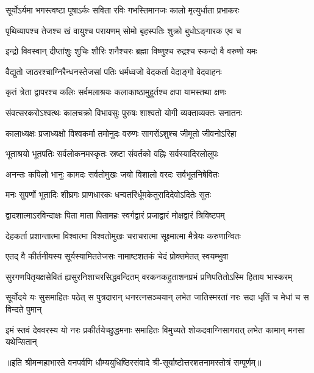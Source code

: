 


\twolineshloka
{सूर्योऽर्यमा भगस्त्वष्टा पूषाऽर्कः सविता रविः}
{गभस्तिमानजः कालो मृत्युर्धाता प्रभाकरः}

\twolineshloka
{पृथिव्यापश्च तेजश्च खं वायुश्च परायणम्}
{सोमो बृहस्पतिः शुक्रो बुधोऽङ्गारक एव च}

\twolineshloka
{इन्द्रो विवस्वान् दीप्तांशुः शुचिः शौरिः शनैश्चरः}
{ब्रह्मा विष्णुश्च रुद्रश्च स्कन्दो वै वरुणो यमः}

\twolineshloka
{वैद्युतो जाठरश्चाग्निरैन्धनस्तेजसां पतिः}
{धर्मध्वजो वेदकर्ता वेदाङ्गो वेदवाहनः}

\twolineshloka
{कृतं त्रेता द्वापरश्च कलिः सर्वमलाश्रयः}
{कलाकाष्ठामुहूर्तश्च क्षपा यामस्तथा क्षणः}

\twolineshloka
{संवत्सरकरोऽश्वत्थः कालचक्रो विभावसुः}
{पुरुषः शाश्वतो योगी व्यक्ताव्यक्तः सनातनः}

\twolineshloka
{कालाध्यक्षः प्रजाध्यक्षो विश्वकर्मा तमोनुदः}
{वरुणः सागरोंऽशुश्च जीमूतो जीवनोऽरिहा}

\twolineshloka
{भूताश्रयो भूतपतिः सर्वलोकनमस्कृतः}
{स्रष्टा संवर्तको वह्निः सर्वस्यादिरलोलुपः}

\twolineshloka
{अनन्तः कपिलो भानुः कामदः सर्वतोमुखः}
{जयो विशालो वरदः सर्वभूतनिषेवितः}

\twolineshloka
{मनः सुपर्णो भूतादिः शीघ्रगः प्राणधारकः}
{धन्वतरिर्धूमकेतुरादिदेवोऽदितेः सुतः}

\twolineshloka
{द्वादशात्माऽरविन्दाक्षः पिता माता पितामहः}
{स्वर्गद्वारं प्रजाद्वारं मोक्षद्वारं त्रिविष्टपम्}

\twolineshloka
{देहकर्ता प्रशान्तात्मा विश्वात्मा विश्वतोमुखः}
{चराचरात्मा सूक्ष्मात्मा मैत्रेयः करुणान्वितः}

\twolineshloka
{एतद् वै कीर्तनीयस्य सूर्यस्यामिततेजसः}
{नामाष्टशतकं चेदं प्रोक्तमेतत् स्वयम्भुवा}

\fourlineindentedshloka
{सुरगणपितृयक्षसेवितं}
{ह्यसुरनिशाचरसिद्धवन्दितम्}
{वरकनकहुताशनप्रभं}
{प्रणिपतितोऽस्मि हिताय भास्करम्}

\fourlineindentedshloka
{सूर्योदये यः सुसमाहितः पठेत्}
{स पुत्रदारान् धनरत्नसञ्चयान्}
{लभेत जातिस्मरतां नरः सदा}
{धृतिं च मेधां च स विन्दते पुमान्}

\fourlineindentedshloka
{इमं स्तवं देववरस्य यो नरः}
{प्रकीर्तयेच्छुद्धमनाः समाहितः}
{विमुच्यते शोकदवाग्निसागरात्}
{लभेत कामान् मनसा यथेप्सितान्}

॥इति श्रीमन्महाभारते वनपर्वणि धौम्ययुधिष्ठिरसंवादे श्री-सूर्याष्टोत्तरशतनामस्तोत्रं सम्पूर्णम्॥
